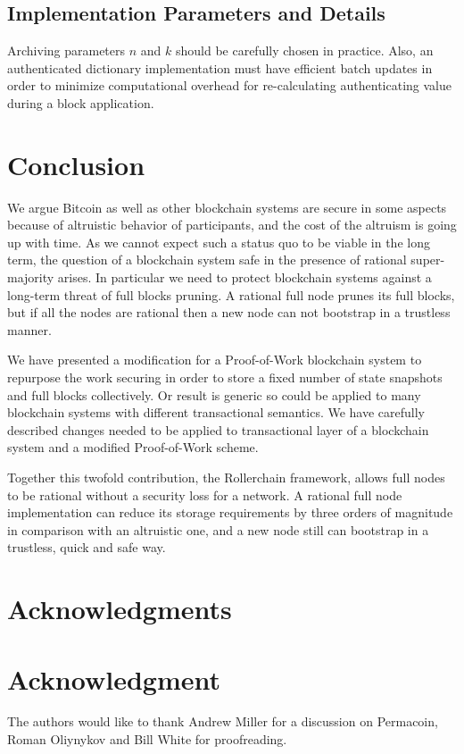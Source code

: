 \documentclass[conference,compsoc]{IEEEtran}
\begin{document}
\subsection{Implementation Parameters and Details}

Archiving parameters \(n\) and \(k\) should be carefully chosen in practice. Also, an authenticated dictionary implementation must have efficient batch updates in order to minimize computational overhead for re-calculating authenticating value during a block application.


\section{Conclusion}
\label{conclusion}

We argue Bitcoin as well as other blockchain systems are secure in some aspects because of altruistic behavior of participants, and the cost of the altruism is going up with time. As we cannot expect such a status quo to be viable in the long term, the question of a blockchain system safe in the presence of rational super-majority arises. In particular we need to protect blockchain systems against a long-term threat of full blocks pruning. A rational full node prunes its full blocks, but if all the nodes are rational then a new node can not bootstrap in a trustless manner. 

We have presented a modification for a Proof-of-Work blockchain system to repurpose the work securing in order to store a fixed number of state snapshots and full blocks collectively. Or result is generic so could be applied to many blockchain systems with different transactional semantics. We have carefully described changes needed to be applied to transactional layer of a blockchain system and a modified Proof-of-Work scheme. 

Together this twofold contribution, the Rollerchain framework, allows full nodes to be rational without a security loss for a network. A rational full node implementation can reduce its storage requirements by three orders of magnitude in comparison with an altruistic one, and a new node still can bootstrap in a trustless, quick and safe way.


\ifCLASSOPTIONcompsoc
\section*{Acknowledgments}
\else
\section*{Acknowledgment}
\fi

The authors would like to thank Andrew Miller for a discussion on Permacoin, Roman Oliynykov and Bill White for proofreading.




\newpage
\onecolumn
\end{document}
